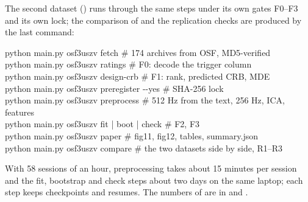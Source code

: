 \documentclass[12pt,a4paper]{article}
\theoremstyle{plain}
\theoremstyle{definition}
\theoremstyle{remark}
\begin{document}
The second dataset () runs through the same steps under its own gates F0--F3 and its own lock; the comparison of  and the replication checks are produced by the last command:
\begin{tcolorbox}[algbox]
\small\ttfamily
python main.py osf3uszv fetch \quad \# 174 archives from OSF, MD5-verified\\
python main.py osf3uszv ratings \quad \# F0: decode the trigger column\\
python main.py osf3uszv design-crb \quad \# F1: rank, predicted CRB, MDE\\
python main.py osf3uszv preregister -{}-yes \quad \# SHA-256 lock\\
python main.py osf3uszv preprocess \quad \# 512 Hz from the text, 256 Hz, ICA, features\\
python main.py osf3uszv fit | boot | check \quad \# F2, F3\\
python main.py osf3uszv paper \quad \# fig11, fig12, tables, summary.json\\
python main.py osf3uszv compare \quad \# the two datasets side by side, R1--R3
\end{tcolorbox}
With 58 sessions of an hour, preprocessing takes about 15 minutes per session and the fit, bootstrap and check steps about two days on the same laptop; each step keeps checkpoints and resumes. The numbers of  are in  and .
\end{document}
